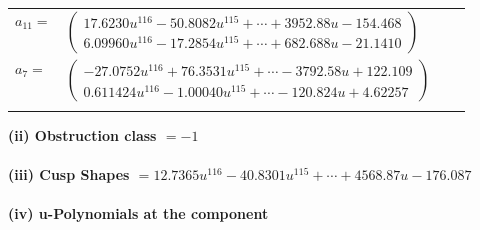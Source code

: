 \documentclass[1p]{elsarticle_modified}
\theoremstyle{definition}
\begin{document}
\begin{tabular}{m{7pt} m{180pt} m{7pt} m{180pt} }
\flushright $a_{11}=$&$\begin{pmatrix}17.6230 u^{116}-50.8082 u^{115}+\cdots+3952.88 u-154.468\\6.09960 u^{116}-17.2854 u^{115}+\cdots+682.688 u-21.1410\end{pmatrix}$ \\
\flushright $a_{7}=$&$\begin{pmatrix}-27.0752 u^{116}+76.3531 u^{115}+\cdots-3792.58 u+122.109\\0.611424 u^{116}-1.00040 u^{115}+\cdots-120.824 u+4.62257\end{pmatrix}$\\&\end{tabular}
\flushleft \textbf{(ii) Obstruction class $= -1$}\\~\\
\flushleft \textbf{(iii) Cusp Shapes $= 12.7365 u^{116}-40.8301 u^{115}+\cdots+4568.87 u-176.087$}\\~\\
\newpage\renewcommand{\arraystretch}{1}
\flushleft \textbf{(iv) u-Polynomials at the component}\newline \\
\end{document}
